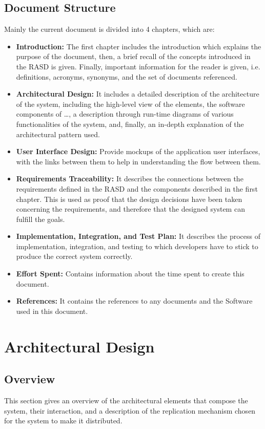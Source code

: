 \documentclass{article}
\begin{document}
\subsection{Document Structure}
Mainly the current document is divided into 4 chapters, which are:
\begin{itemize}
    \item \textbf{Introduction:} The first chapter includes the introduction which explains the purpose of the document, then, a brief recall of the concepts introduced in the RASD is given. Finally, important information for the reader is given, i.e. definitions, acronyms, synonyms, and the set of documents referenced. 
    \item \textbf{Architectural Design:} It includes a detailed description of the architecture of the system, including the high-level view of the elements, the software components of …, a description through run-time diagrams of various functionalities of the system, and, finally, an in-depth explanation of the architectural pattern used.
    \item \textbf{User Interface Design:} Provide mockups of the application user interfaces, with the links between them to help in understanding the flow between them. 
    \item \textbf{Requirements Traceability:} It describes the connections between the requirements defined in the RASD and the components described in the first chapter. This is used as proof that the design decisions have been taken concerning the requirements, and therefore that the designed system can fulfill the goals. 
    \item \textbf{Implementation, Integration, and Test Plan:} It describes the process of implementation, integration, and testing to which developers have to stick to produce the correct system correctly. 
    \item \textbf{Effort Spent:} Contains information about the time spent to create this document. 
    \item \textbf{References:} It contains the references to any documents and the Software used in this document. 
\end{itemize}
\section{Architectural Design}

\subsection{Overview}
This section gives an overview of the architectural elements that compose the system, their interaction, and a description of the replication mechanism chosen for the system to make it distributed.
\end{document}
